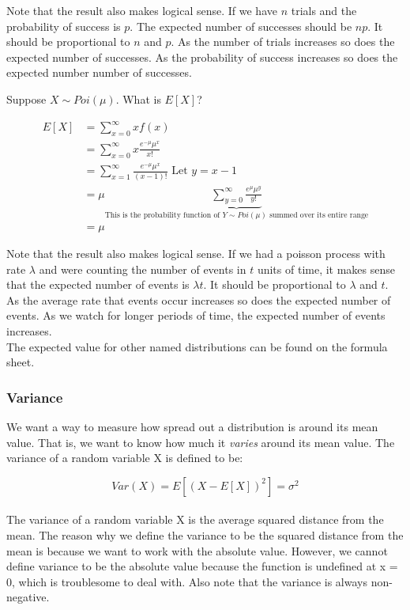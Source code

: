 \documentclass[12pt, letterpaper]{article}
\begin{document}
Note that the result also makes logical sense. If we have \(n\) trials and the probability of success is \(p\). The expected number of successes should be \(np\). It should be proportional to \(n\) and \(p\). As the number of trials increases so does the expected number of successes. As the probability of success increases so does the expected number number of successes.\\

\newpage

Suppose \(X \sim Poi(\mu)\). What is \(E[X]\)?

\begin{align*}
E[X] &= \sum_{x = 0}^{\infty} xf\left(x\right)\\
&= \sum_{x = 0}^{\infty} x\frac{e^{-\mu}\mu^x}{x!}\\
&= \sum_{x = 1}^{\infty} \frac{e^{-\mu}\mu^x}{(x - 1)!} \text{ Let } y = x - 1\\
&= \mu \underbrace{\sum_{y = 0}^{\infty} \frac{e^{\mu}\mu^y}{y!}}_\text{This is the probability function of $Y \sim Poi(\mu)$ summed over its entire range}\\
&= \mu
\end{align*}

Note that the result also makes logical sense. If we had a poisson process with rate \(\lambda\) and were counting the number of events in \(t\) units of time, it makes sense that the expected number of events is \(\lambda t\). It should be proportional to \(\lambda\) and \(t\). As the average rate that events occur increases so does the expected number of events. As we watch for longer periods of time, the expected number of events increases.\\

The expected value for other named distributions can be found on the formula sheet.

\subsubsection{Variance}
We want a way to measure how spread out a distribution is around its mean value. That is, we want to know how much it \emph{varies} around its mean value. The variance of a random variable X is defined to be:

\begin{equation}
Var\left(X\right) = E[(X - E[X])^2] = \sigma^2
\end{equation}\\

The variance of a random variable X is the average squared distance from the mean. The reason why we  define the variance to be the squared distance from the mean is because we want to work with the absolute value. However, we cannot define variance to be the absolute value because the function is undefined at x = 0, which is troublesome to deal with. Also note that the variance is always non-negative.\\
\end{document}
